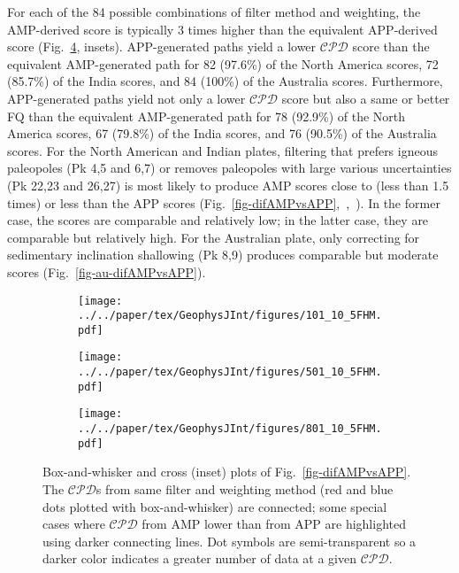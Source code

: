 For each of the 84 possible combinations of filter method and weighting, the
AMP-derived score is typically 3 times higher than the equivalent
APP-derived score (Fig.~\ref{fig-boxAMPvsAPP}, insets). APP-generated paths
yield a lower $\mathcal{CPD}$ score than the equivalent AMP-generated path for
82 (97.6\%) of the North America scores, 72 (85.7\%) of the India scores, and 84
(100\%) of the Australia scores. Furthermore, APP-generated paths yield not only
a lower $\mathcal{CPD}$ score but also a same or better FQ than the equivalent
AMP-generated path for 78 (92.9\%) of the North America scores, 67 (79.8\%) of
the India scores, and 76 (90.5\%) of the Australia scores. For the North
American and Indian plates, filtering that prefers igneous paleopoles (Pk 4,5
and 6,7) or removes paleopoles with large various uncertainties (Pk 22,23 and
26,27) is most likely to produce AMP scores close to (less than 1.5 times) or
less than the APP scores
(Fig.~\ref{fig-difAMPvsAPP},~,~).
In the former case, the scores are comparable and relatively low; in the latter
case, they are comparable but relatively high. For the Australian plate, only
correcting for sedimentary inclination shallowing (Pk 8,9) produces comparable
but moderate scores (Fig.~\ref{fig-au-difAMPvsAPP}).

\begin{figure}
  \centering
  \begin{subfigure}{1\textwidth}
    \texttt{[image: ../../paper/tex/GeophysJInt/figures/101\_10\_5FHM.pdf]}
    \caption{}\label{fig-na-boxAMPvsAPP}
  \end{subfigure}
  \vspace{.1em}
  \begin{subfigure}{1\textwidth}
    \texttt{[image: ../../paper/tex/GeophysJInt/figures/501\_10\_5FHM.pdf]}
    \caption{}\label{fig-in-boxAMPvsAPP}
  \end{subfigure}
  \vspace{.1em}
  \begin{subfigure}{1\textwidth}
    \texttt{[image: ../../paper/tex/GeophysJInt/figures/801\_10\_5FHM.pdf]}
    \caption{}\label{fig-au-boxAMPvsAPP}
  \end{subfigure}
  \caption[]{Box-and-whisker and cross (inset) plots of
Fig.~\ref{fig-difAMPvsAPP}. The $\mathcal{CPD}$s from same filter and weighting
method (red and blue dots plotted with box-and-whisker) are connected; some
special cases where $\mathcal{CPD}$ from AMP lower than from APP are highlighted
using darker connecting lines. Dot symbols are semi-transparent so a darker
color indicates a greater number of data at a given
$\mathcal{CPD}$.}\label{fig-boxAMPvsAPP}
\end{figure}

